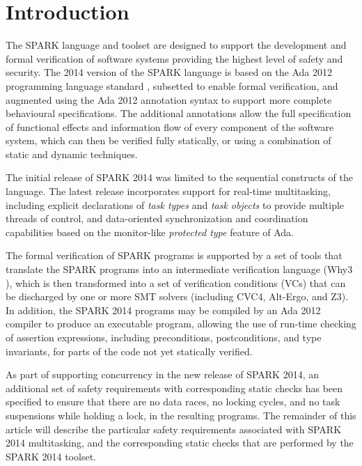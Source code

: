 \documentclass[conference,compsoc]{IEEEtran}
\begin{document}


\section{Introduction}
The SPARK language and toolset \cite{spark} are designed to support the
development and formal verification of software systems providing the
highest level of safety and security. The 2014 version of the SPARK
language is based on the Ada 2012 programming language standard \cite{lrm},
subsetted to enable formal verification, and augmented using the Ada 2012
annotation syntax to support more complete behavioural specifications. The
additional annotations allow the full specification of functional effects
and information flow of every component of the software system, which can
then be verified fully statically, or using a combination of static and
dynamic techniques.

The initial release of SPARK 2014 was limited to the sequential constructs
of the language. The latest release incorporates support for real-time
multitasking, including explicit declarations of \emph{task types} and
\emph{task objects} to provide multiple threads of control, and
data-oriented synchronization and coordination capabilities based on the
monitor-like \emph{protected type} feature of Ada.

The formal verification of SPARK programs is supported by a set of tools
that translate the SPARK programs into an intermediate verification
language (Why3 \cite{why3}), which is then transformed into a set of
verification conditions (VCs) that can be discharged by one or more SMT
solvers \cite{smt} (including CVC4, Alt-Ergo, and Z3). In addition, the
SPARK 2014 programs may be compiled by an Ada 2012 compiler to produce an
executable program, allowing the use of run-time checking of assertion
expressions, including preconditions, postconditions, and type invariants,
for parts of the code not yet statically verified.

As part of supporting concurrency in the new release of SPARK 2014, an
additional set of safety requirements with corresponding static checks has
been specified to ensure that there are no data races, no locking cycles,
and no task suspensions while holding a lock, in the resulting programs.
The remainder of this article will describe the particular safety
requirements associated with SPARK 2014 multitasking, and the corresponding
static checks that are performed by the SPARK 2014 toolset.
\end{document}
